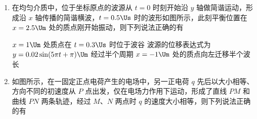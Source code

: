 \documentclass[\gkver]{gaokaozhenti}
\begin{document}
\begin{enumerate}
{则
$U_{1}' = I_{2}R + U_{2} = I_{2}R + \left(\frac{n_{2}}{n_{2}'}\right)^{2}I_{2}R_{\text{用}} = I_{2}(R + R_{\text{等}})$
$R_{\text{等}} = \left(\frac{n_{2}}{n_{2}'}\right)^{2}R_{\text{用}}$，则
$U_{1}' = I_{2}(R + R_{\text{等}})$

随着用户接入的用电器增多，副线圈接入电器的总电阻 $R_{\text{用}}$ 减小，则 $R_{\text{等}}$ 减小，输入线路中电流 $I_{2}$ 增大。$R$ 消耗的功率
$P_{\text{损}} = I_{2}^{2}R$

T$_{2}$ 的输出电压
$U_{2}' = \frac{n_{2}'}{n_{2}}(U_{1}' - I_{2}R)$

用电器增多后，$I_{2}$ 增大，$R$ 消耗的功率增大，T$_{2}$ 的输出电压 $U_{2}'$ 降低，故 C 错误，D 正确。故选 BD。
}

\item
在均匀介质中，位于坐标原点的波源从 $t = 0$ 时刻开始沿 $y$ 轴做简谐运动，形成沿 $x$ 轴传播的简谐横波，$t = 0.5 \Us$ 时的波形如图所示，此刻平衡位置在 $x = 2.5 \Um$ 处的质点刚开始振动，则下列说法正确的有


{$x = 1 \Um$ 处质点在 $t = 0.3 \Us$ 时位于波谷}
{波源的位移表达式为 $y = 0.02\sin(5\pi t + \pi) \Um$}
{经过半个周期 $x = -1 \Um$ 处的质点向左迁移半个波长}


\item
如图所示，在一固定正点电荷产生的电场中，另一正电荷 $q$ 先后以大小相等、方向不同的初速度从 $P$ 点出发，仅在电场力作用下运动，形成了直线 $PM$ 和曲线 $PN$ 两条轨迹，经过 $M$、$N$ 两点时 $q$ 的速度大小相等，则下列说法正确的有


\end{enumerate}
\end{document}
